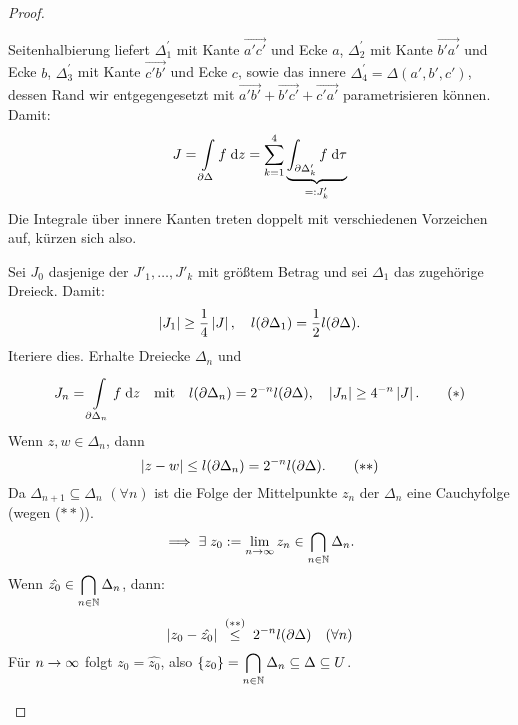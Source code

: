 \documentclass[a4paper,twoside,DIV15,BCOR12mm]{scrbook}
\begin{document}
\begin{proof}
\begin{enumerate}
\begin{center}
\begin{tikzpicture}[scale=3]
\end{tikzpicture}
\end{center}

Seitenhalbierung liefert $\Delta_1^\prime$ mit Kante $\overrightarrow{a' c'}$ und Ecke $a$, $\Delta_2^\prime$ mit Kante $\overrightarrow{b' a'}$ und Ecke $b$, $\Delta_3^\prime$ mit Kante $\overrightarrow{c' b'}$ und Ecke $c$, sowie das innere $\Delta_4^\prime = \Delta(a',b',c')$, dessen Rand wir entgegengesetzt mit $\overrightarrow{a'b'} + \overrightarrow{b'c'}+\overrightarrow{c' a'}$ parametrisieren können. Damit:
\[J=\Integral{\partial\Delta}{}{f}{z} = \sum_{k=1}^4\underbrace{\integral{\partial\Delta'_k}{}{f}{\tau}}_{\ad J'_k}\]
Die Integrale über innere Kanten treten doppelt mit verschiedenen Vorzeichen auf, kürzen sich also.

Sei $J_0$ dasjenige der $J'_1,\dotsc,J'_k$ mit größtem Betrag und sei $\Delta_1$ das zugehörige Dreieck. Damit:
\[\abs{J_1}\geq\frac{1}{4}\abs{J},\quad l(\partial\Delta_1)=\frac{1}{2}l(\partial\Delta).\]
Iteriere dies. Erhalte Dreiecke $\Delta_n$ und
\[J_n = \Integral{\partial\Delta_n}{}{f}{z}\quad\text{mit}\quad l(\partial\Delta_n)=2^{-n}l(\partial\Delta),\quad\abs{J_n}\geq 4^{-n}\abs{J}.\tag{$*$}\]
Wenn $z,w\in\Delta_n$, dann
\[\abs{z-w}\leq l(\partial\Delta_n) = 2^{-n}l(\partial\Delta).\tag{$**$}\]
Da $\Delta_{n+1}\subseteq \Delta_n$ $(\forall n)$ ist die Folge der Mittelpunkte $z_n$ der $\Delta_n$ eine Cauchyfolge (wegen ($**$)).
\[\folgt\exists\; z_0\da \lim_{n\ra\infty}z_n\in\bigcap_{\nat{n}}\Delta_n.\]
Wenn $\displaystyle \hat{z_0}\in\bigcap_{\nat{n}}\Delta_n$, dann:
\[\abs{z_0-\hat{z_0}}\wegen{\leq}{(**)}2^{-n}l(\partial\Delta)\quad(\forall n)\]
Für $n\ra\infty$ folgt $z_0 = \hat{z_0}$, also $\displaystyle\{z_0\}=\bigcap_{\nat{n}}\Delta_n\subseteq\Delta\subseteq U$.
\end{enumerate}
\end{proof}
\renewcommand{\labelenumi}{\alph{enumi})}
\end{document}
